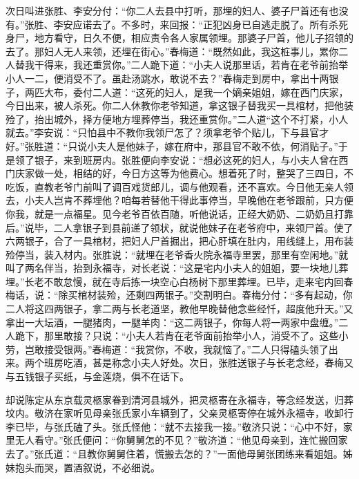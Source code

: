 次日叫进张胜、李安分付：“你二人去县中打听，那埋的妇人、婆子尸首还有也没有。”张胜、李安应诺去了。不多时，来回报：“正犯凶身已自逃走脱了。所有杀死身尸，地方看守，日久不便，相应责令各人家属领埋。那婆子尸首，他儿子招领的去了。那妇人无人来领，还埋在街心。”春梅道：“既然如此，我这桩事儿，累你二人替我干得来，我还重赏你。”二人跪下道：“小夫人说那里话，若肯在老爷前抬举小人一二，便消受不了。虽赴汤跳水，敢说不去？”春梅走到房中，拿出十两银子，两匹大布，委付二人道：“这死的妇人，是我一个嫡亲姐姐，嫁在西门庆家，今日出来，被人杀死。你二人休教你老爷知道，拿这银子替我买一具棺材，把他装殓了，抬出城外，择方便地方埋葬停当，我还重赏你。”二人道“这个不打紧，小人就去。”李安说：“只怕县中不教你我领尸怎了？须拿老爷个贴儿，下与县官才好。”张胜道：“只说小夫人是他妹子，嫁在府中，那县官不敢不依，何消贴子。”于是领了银子，来到班房内。张胜便向李安说：“想必这死的妇人，与小夫人曾在西门庆家做一处，相结的好，今日方这等为他费心。想着死了时，整哭了三四日，不吃饭，直教老爷门前叫了调百戏货郎儿，调与他观看，还不喜欢。今日他无亲人领去，小夫人岂肯不葬埋他？咱每若替他干得此事停当，早晚他在老爷跟前，只方便你我，就是一点福星。见今老爷百依百随，听他说话，正经大奶奶、二奶奶且打靠后。”说毕，二人拿银子到县前递了领状，就说他妹子在老爷府中，来领尸首。使了六两银子，合了一具棺材，把妇人尸首掘出，把心肝填在肚内，用线缝上，用布装殓停当，装入材内。张胜说：“就埋在老爷香火院永福寺里罢，那里有空闲地。”就叫了两名伴当，抬到永福寺，对长老说：“这是宅内小夫人的姐姐，要一块地儿葬埋。”长老不敢怠慢，就在寺后拣一块空心白杨树下那里葬埋。已毕，走来宅内回春梅话，说：“除买棺材装殓，还剩四两银子。”交割明白。春梅分付：“多有起动，你二人将这四两银子，拿二两与长老道坚，教他早晚替他念些经忏，超度他升天。”又拿出一大坛酒，一腿猪肉，一腿羊肉：“这二两银子，你每人将一两家中盘缠。”二人跪下，那里敢接？只说：“小夫人若肯在老爷面前抬举小人，消受不了。这些小劳，岂敢接受银两。”春梅道：“我赏你，不收，我就恼了。”二人只得磕头领了出来。两个班房吃酒，甚是称念小夫人好处。次日，张胜送银子与长老念经，春梅又与五钱银子买纸，与金莲烧，俱不在话下。

却说陈定从东京载灵柩家眷到清河县城外，把灵柩寄在永福寺，等念经发送，归葬坟内。敬济在家听见母亲张氏家小车辆到了，父亲灵柩寄停在城外永福寺，收卸行李已毕，与张氏磕了头。张氏怪他：“就不去接我一接。”敬济只说：“心中不好，家里无人看守。”张氏便问：“你舅舅怎的不见？”敬济道：“他见母亲到，连忙搬回家去了。”张氏道：“且教你舅舅住着，慌搬去怎的？”一面他母舅张团练来看姐姐。姊妹抱头而哭，置酒叙说，不必细说。

